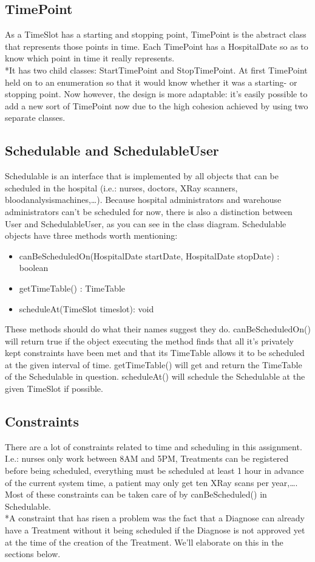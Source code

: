 \documentclass[12pt]{article}
\begin{document}
\subsection{TimePoint}
As a TimeSlot has a starting and stopping point, TimePoint is the abstract class that represents those points in time. Each TimePoint has a HospitalDate so as to know which point in time it really represents.
\\*It has two child classes: StartTimePoint and StopTimePoint. At first TimePoint held on to an enumeration so that it would know whether it was a starting- or stopping point. Now however, the design is more adaptable: it's easily possible to add a new sort of TimePoint now due to the high cohesion achieved by using two separate classes.

\subsection{Schedulable and SchedulableUser}
Schedulable is an interface that is implemented by all objects that can be scheduled in the hospital (i.e.: nurses, doctors, XRay scanners, bloodanalysismachines,…). Because hospital administrators and warehouse administrators can’t be scheduled for now, there is also a distinction between User and SchedulableUser, as you can see in the class diagram.
Schedulable objects have three methods worth mentioning: 
\begin{itemize}
\item{canBeScheduledOn(HospitalDate startDate, HospitalDate stopDate) : boolean}
\item{getTimeTable() : TimeTable}
\item{scheduleAt(TimeSlot timeslot): void}
\end{itemize}
These methods should do what their names suggest they do. canBeScheduledOn() will return true if the object executing the method finds that all it’s privately kept constraints have been met and that its TimeTable allows it to be scheduled at the given interval of time. getTimeTable() will get and return the TimeTable of the Schedulable in question. scheduleAt() will schedule the Schedulable at the given TimeSlot if possible.

\subsection{Constraints}
There are a lot of constraints related to time and scheduling in this assignment. I.e.: nurses only work between 8AM and 5PM, Treatments can be registered before being scheduled, everything must be scheduled at least 1 hour in advance of the current system time, a patient may only get ten XRay scans per year,\dots. Most of these constraints can be taken care of by canBeScheduled() in Schedulable. 
\\*A constraint that has risen a problem was the fact that a Diagnose can already have a Treatment without it being scheduled if the Diagnose is not approved yet at the time of the creation of the Treatment. We'll elaborate on this in the sections below.
\end{document}
